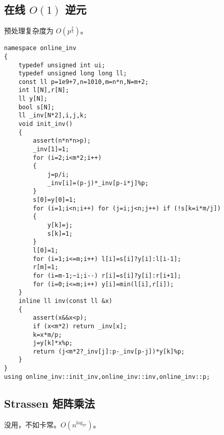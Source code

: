 \documentclass[12pt]{ctexart}
\begin{document}
\subsection{在线 $O(1)$ 逆元}

预处理复杂度为 $O(p^{\frac{2}{3}})$。

\begin{lstlisting}
namespace online_inv
{
	typedef unsigned int ui;
	typedef unsigned long long ll;
	const ll p=1e9+7,n=1010,m=n*n,N=m+2;
	int l[N],r[N];
	ll y[N];
	bool s[N];
	ll _inv[N*2],i,j,k;
	void init_inv()
	{
		assert(n*n*n>p);
		_inv[1]=1;
		for (i=2;i<m*2;i++)
		{
			j=p/i;
			_inv[i]=(p-j)*_inv[p-i*j]%p;
		}
		s[0]=y[0]=1;
		for (i=1;i<n;i++) for (j=i;j<n;j++) if (!s[k=i*m/j])
		{
			y[k]=j;
			s[k]=1;
		}
		l[0]=1;
		for (i=1;i<=m;i++) l[i]=s[i]?y[i]:l[i-1];
		r[m]=1;
		for (i=m-1;~i;i--) r[i]=s[i]?y[i]:r[i+1];
		for (i=0;i<=m;i++) y[i]=min(l[i],r[i]);
	}
	inline ll inv(const ll &x)
	{
		assert(x&&x<p);
		if (x<m*2) return _inv[x];
		k=x*m/p;
		j=y[k]*x%p;
		return (j<m*2?_inv[j]:p-_inv[p-j])*y[k]%p;
	}
}
using online_inv::init_inv,online_inv::inv,online_inv::p;
\end{lstlisting}

\subsection{Strassen 矩阵乘法}

没用，不如卡常。$O(n^{\log_27})$。
\end{document}
